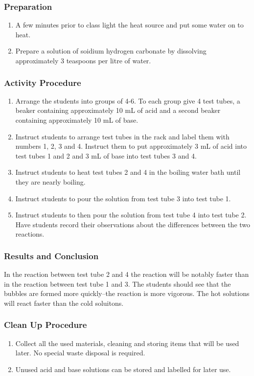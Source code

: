 \subsubsection*{Preparation}
\begin{enumerate}
\item{A few minutes prior to class light the heat source and put some water on to heat.}
\item{Prepare a solution of soidium hydrogen carbonate by dissolving approximately 3 teaspoons per litre of water.}
\end{enumerate}

\subsubsection*{Activity Procedure}
\begin{enumerate}
\item{Arrange the students into groups of 4-6. To each group give 4 test tubes, a beaker containing approximately 10 mL of acid and a second beaker containing approximately 10 mL of base.}
\item{Instruct students to arrange test tubes in the rack and label them with numbers 1, 2, 3 and 4. Instruct them to put approximately 3 mL of acid into test tubes 1 and 2 and 3 mL of base into test tubes 3 and 4.}
\item{Instruct students to heat test tubes 2 and 4 in the boiling water bath until they are nearly boiling.}
\item{Instruct students to pour the solution from test tube 3 into test tube 1.}
\item{Instruct students to then pour the solution from test tube 4 into test tube 2. Have students record their observations about the differences between the two reactions.}
\end{enumerate}

\subsubsection*{Results and Conclusion}
In the reaction between test tube 2 and 4 the reaction will be notably faster than in the reaction between test tube 1 and 3. The students should see that the bubbles are formed more quickly--the reaction is more vigorous. The hot solutions will react faster than the cold soluitons.

\subsubsection*{Clean Up Procedure}
\begin{enumerate}
\item{Collect all the used materials, cleaning and storing items that will be used later. No special waste disposal is required.}
\item{Unused acid and base solutions can be stored and labelled for later use.}
\end{enumerate}

